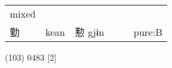 \documentclass[14pt,a4paper]{scrartcl}
\begin{document}
\begin{longtable}[c]{@{}llllll@{}}
\begin{minipage}[t]{0.14\columnwidth}
mixed
\strut\end{minipage}\tabularnewline
\begin{minipage}[t]{0.14\columnwidth}\raggedright\strut
勤
\strut\end{minipage} &
\begin{minipage}[t]{0.14\columnwidth}\raggedright\strut
kean
\strut\end{minipage} &
\begin{minipage}[t]{0.14\columnwidth}\raggedright\strut
懃 gjɨn
\strut\end{minipage} &
\begin{minipage}[t]{0.14\columnwidth}\raggedright\strut
\strut\end{minipage} &
\begin{minipage}[t]{0.14\columnwidth}\raggedright\strut
\strut\end{minipage} &
\begin{minipage}[t]{0.14\columnwidth}\raggedright\strut
pure:B
\strut\end{minipage}\tabularnewline
\bottomrule
\end{longtable}

(103) 0483 {[}2{]}
\end{document}
